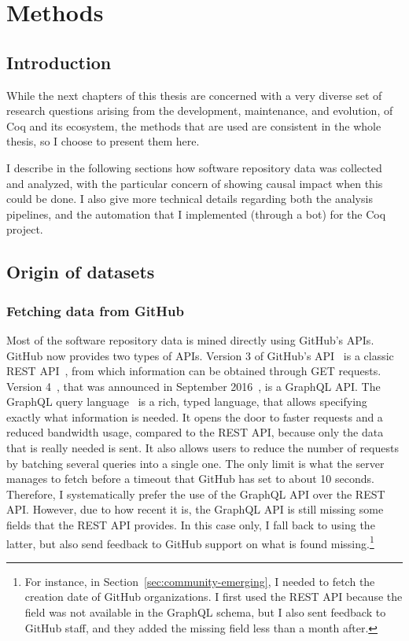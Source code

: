 \chapter{Methods}

\label{chap:methods}

\section{Introduction}

While the next chapters of this thesis are concerned with a very diverse set of research questions arising from the development, maintenance, and evolution, of Coq and its ecosystem, the methods that are used are consistent in the whole thesis, so I choose to present them here.

I describe in the following sections how software repository data was collected and analyzed, with the particular concern of showing causal impact when this could be done.
I also give more technical details regarding both the analysis pipelines, and the automation that I implemented (through a bot) for the Coq project.

\section{Origin of datasets}

\subsection{Fetching data from GitHub}

\label{sec:fetch_data}

Most of the software repository data is mined directly using GitHub's APIs.
GitHub now provides two types of APIs.
Version 3 of GitHub's API~\cite{github_REST_API} is a classic REST API~\cite{fielding2000}, from which information can be obtained through GET requests.
Version 4~\cite{github_graphql_API}, that was announced in September 2016~\cite{github_graphql_API_announcement}, is a GraphQL API.
The GraphQL query language~\cite{byron2017graphql} is a rich, typed language, that allows specifying exactly what information is needed.
It opens the door to faster requests and a reduced bandwidth usage, compared to the REST API, because only the data that is really needed is sent.
It also allows users to reduce the number of requests by batching several queries into a single one.
The only limit is what the server manages to fetch before a timeout that GitHub has set to about 10 seconds.
Therefore, I systematically prefer the use of the GraphQL API over the REST API.
However, due to how recent it is, the GraphQL API is still missing some fields that the REST API provides.
In this case only, I fall back to using the latter, but also send feedback to GitHub support on what is found missing.\footnote{
	For instance, in Section~\ref{sec:community-emerging}, I needed to fetch the creation date of GitHub organizations.
	I first used the REST API because the field was not available in the GraphQL schema, but I also sent feedback to GitHub staff, and they added the missing field less than a month after.
}

